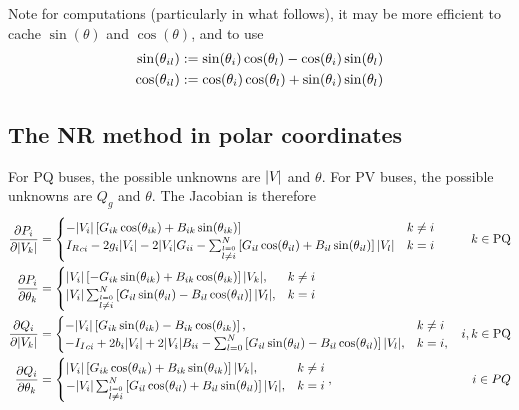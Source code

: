 \documentclass[10pt]{article}
\newcommand{\Ir}{{I_R}}
\newcommand{\Ii}{{I_I}}
\begin{document}
Note for computations (particularly in what follows), it may be more efficient to cache $\sin(\theta)$ and $\cos(\theta)$, and to use
\begin{align}
	\sin(\theta_{il}) &:= \sin(\theta_i)\cos(\theta_l) - \cos(\theta_i)\sin(\theta_l) \notag \\
	\cos(\theta_{il}) &:= \cos(\theta_i)\cos(\theta_l) + \sin(\theta_i)\sin(\theta_l)
\end{align}


\subsection{The NR method in polar coordinates}
For PQ buses, the possible unknowns are $|V_{}|$ and $\theta$. For PV buses, the possible unknowns are $Q_g$ and $\theta$. The Jacobian is therefore
\begin{align}
	\frac{\partial P_i}{\partial \M{k}} &= 
		\begin{cases}
			-\M{i}\left[G_{ik}\cs{ik} + B_{ik}\sn{ik}\right] & k \ne i \\
			\Ir_{ci} - 2g_i\M{i} - 2 \M{i}G_{ii} - \sum_{\stackrel{l = 0}{l \ne i}}^N{\left[G_{il}\cs{il} + B_{il}\sn{il}\right]\M{l}} & k = i
		\end{cases} & k \in \text{PQ} \notag \\
	\frac{\partial P_i}{\partial \theta_k} &=
		\begin{cases}
			\M{i}\left[-G_{ik}\sn{ik} + B_{ik}\cs{ik}\right]\M{k}, &k \ne i \\
			\M{i}\sum_{\stackrel{l = 0}{l \ne i}}^N{\left[G_{il}\sn{il} - B_{il}\cs{il}\right]\M{l}}, &k = i
		\end{cases} \notag \\
	\frac{\partial Q_i}{\partial \M{k}} &= 
		\begin{cases}
			-\M{i}\left[G_{ik}\sn{ik} - B_{ik}\cs{ik}\right], & k \ne i \\
			-\Ii_{ci} + 2b_i\M{i} + 2\M{i}B_{ii} - \sum_{l = 0}^N{\left[G_{il}\sn{il} - B_{il}\cs{il}\right]\M{l}}, & k = i, \\
		\end{cases} &  i, k \in \text{PQ} \notag \\
	\frac{\partial Q_i}{\partial \theta_k} &= 
		\begin{cases}
			\M{i}\left[G_{ik}\cs{ik} + B_{ik}\sn{ik}\right]\M{k}, & k \ne i \\
			-\M{i}\sum_{\stackrel{l = 0}{l \ne i}}^N{\left[G_{il}\cs{il} + B_{il}\sn{il}\right]\M{l}}, & k = i \\
		\end{cases}, & i \in PQ
\end{align}
\end{document}
